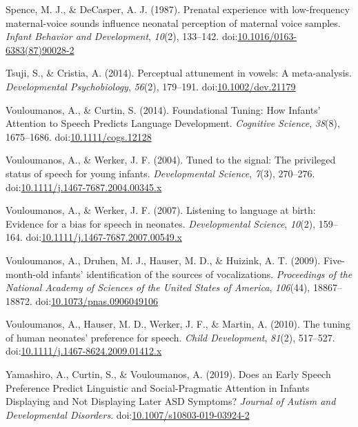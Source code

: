 \documentclass[man]{apa6}
\begin{document}
\hypertarget{ref-spence_prenatal_1987}{}
Spence, M. J., \& DeCasper, A. J. (1987). Prenatal experience with
low-frequency maternal-voice sounds influence neonatal perception of
maternal voice samples. \emph{Infant Behavior and Development},
\emph{10}(2), 133--142.
doi:\href{https://doi.org/10.1016/0163-6383(87)90028-2}{10.1016/0163-6383(87)90028-2}

\hypertarget{ref-tsuji_perceptual_2014}{}
Tsuji, S., \& Cristia, A. (2014). Perceptual attunement in vowels: A
meta-analysis. \emph{Developmental Psychobiology}, \emph{56}(2),
179--191.
doi:\href{https://doi.org/10.1002/dev.21179}{10.1002/dev.21179}

\hypertarget{ref-vouloumanos_foundational_2014}{}
Vouloumanos, A., \& Curtin, S. (2014). Foundational Tuning: How Infants'
Attention to Speech Predicts Language Development. \emph{Cognitive
Science}, \emph{38}(8), 1675--1686.
doi:\href{https://doi.org/10.1111/cogs.12128}{10.1111/cogs.12128}

\hypertarget{ref-vouloumanos_tuned_2004}{}
Vouloumanos, A., \& Werker, J. F. (2004). Tuned to the signal: The
privileged status of speech for young infants. \emph{Developmental
Science}, \emph{7}(3), 270--276.
doi:\href{https://doi.org/10.1111/j.1467-7687.2004.00345.x}{10.1111/j.1467-7687.2004.00345.x}

\hypertarget{ref-vouloumanos_listening_2007}{}
Vouloumanos, A., \& Werker, J. F. (2007). Listening to language at
birth: Evidence for a bias for speech in neonates. \emph{Developmental
Science}, \emph{10}(2), 159--164.
doi:\href{https://doi.org/10.1111/j.1467-7687.2007.00549.x}{10.1111/j.1467-7687.2007.00549.x}

\hypertarget{ref-vouloumanos_five-month-old_2009}{}
Vouloumanos, A., Druhen, M. J., Hauser, M. D., \& Huizink, A. T. (2009).
Five-month-old infants' identification of the sources of vocalizations.
\emph{Proceedings of the National Academy of Sciences of the United
States of America}, \emph{106}(44), 18867--18872.
doi:\href{https://doi.org/10.1073/pnas.0906049106}{10.1073/pnas.0906049106}

\hypertarget{ref-vouloumanos_tuning_2010}{}
Vouloumanos, A., Hauser, M. D., Werker, J. F., \& Martin, A. (2010). The
tuning of human neonates' preference for speech. \emph{Child
Development}, \emph{81}(2), 517--527.
doi:\href{https://doi.org/10.1111/j.1467-8624.2009.01412.x}{10.1111/j.1467-8624.2009.01412.x}

\hypertarget{ref-yamashiro_does_2019}{}
Yamashiro, A., Curtin, S., \& Vouloumanos, A. (2019). Does an Early
Speech Preference Predict Linguistic and Social-Pragmatic Attention in
Infants Displaying and Not Displaying Later ASD Symptoms? \emph{Journal
of Autism and Developmental Disorders}.
doi:\href{https://doi.org/10.1007/s10803-019-03924-2}{10.1007/s10803-019-03924-2}

\endgroup
\end{document}
